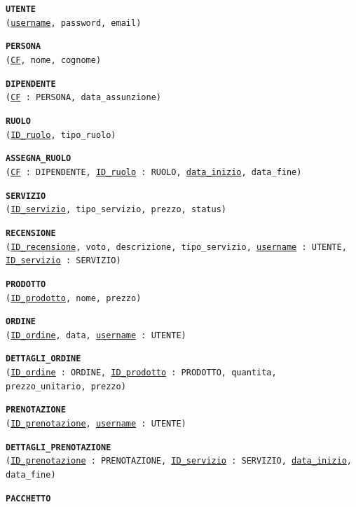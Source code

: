 \documentclass[a4paper,12pt]{report}
\begin{document}
\begin{description}
	\item\texttt{\textbf{UTENTE} \\
		      (\underline{username}, password, email)}
	\item\texttt{\textbf{PERSONA} \\
		      (\underline{CF}, nome, cognome)}
	\item\texttt{\textbf{DIPENDENTE} \\
		      (\underline{CF} : PERSONA, data\_assunzione)}
	\item\texttt{\textbf{RUOLO} \\
		      (\underline{ID\_ruolo}, tipo\_ruolo)}
	\item\texttt{\textbf{ASSEGNA\_RUOLO} \\
		      (\underline{CF} : DIPENDENTE, \underline{ID\_ruolo} : RUOLO, \underline{data\_inizio}, data\_fine)}
	\item\texttt{\textbf{SERVIZIO} \\
		      (\underline{ID\_servizio}, tipo\_servizio, prezzo, status)}
	\item\texttt{\textbf{RECENSIONE} \\
		      (\underline{ID\_recensione}, voto, descrizione, tipo\_servizio, \underline{username} \newline : UTENTE, \underline{ID\_servizio} : SERVIZIO)}
	\item\texttt{\textbf{PRODOTTO} \\
		      (\underline{ID\_prodotto}, nome, prezzo)}
	\item\texttt{\textbf{ORDINE} \\
		      (\underline{ID\_ordine}, data, \underline{username} : UTENTE)}
	\item\texttt{\textbf{DETTAGLI\_ORDINE} \\
		      (\underline{ID\_ordine} : ORDINE, \underline{ID\_prodotto} : PRODOTTO, quantita, \newline prezzo\_unitario, prezzo)}
	\item\texttt{\textbf{PRENOTAZIONE} \\
		      (\underline{ID\_prenotazione}, \underline{username} : UTENTE)}
	\item\texttt{\textbf{DETTAGLI\_PRENOTAZIONE} \\
		      (\underline{ID\_prenotazione} : PRENOTAZIONE, \underline{ID\_servizio} : SERVIZIO, \newline \underline{data\_inizio}, data\_fine)}
	\item\texttt{\textbf{PACCHETTO} \\
}
\end{description}
\end{document}
